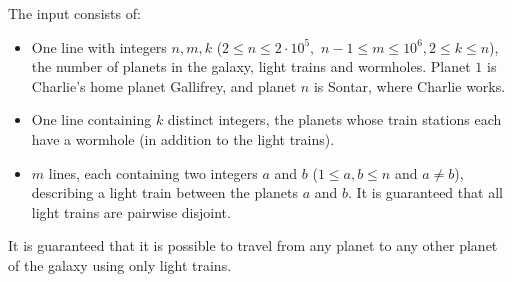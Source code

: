 
    The input consists of:
    \begin{itemize}
		\item One line with integers $n, m, k$ ($2 \leq n \leq 2\cdot10^5,$ $n - 1 \leq m \leq 10^6, 2\leq k\leq n$), the number of planets in the galaxy, light trains and
			wormholes.
			Planet $1$ is Charlie's home planet Gallifrey, and planet $n$ is Sontar, where Charlie works. 
		\item One line containing $k$ distinct integers, the planets whose
			train stations each have a wormhole (in addition to the light trains).
		\item $m$ lines, each containing two integers $a$ and $b$ ($1 \leq a,b
			\leq n$ and $a \neq b$), describing a light train between the planets $a$ and $b$.
			It is guaranteed that all light trains are pairwise disjoint.
    \end{itemize}
	It is guaranteed that it is possible to travel from any planet to any other planet of the galaxy using only light trains. 

